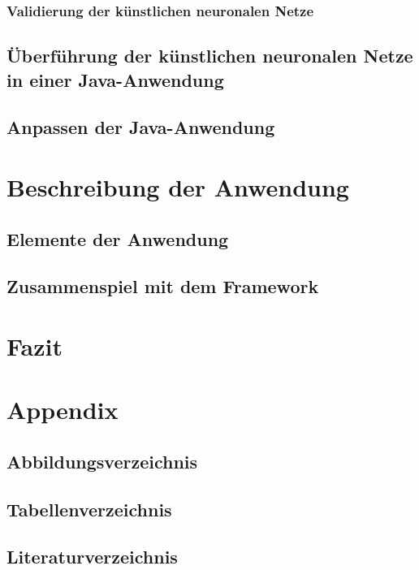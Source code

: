 \documentclass[11pt,a4paper]{scrreprt}
\begin{document}
  \subsection{Validierung der künstlichen neuronalen Netze}
	\section{Überführung der künstlichen neuronalen Netze in einer Java-Anwendung}
	\section{Anpassen der Java-Anwendung}

\chapter{Beschreibung der Anwendung}
 \section{Elemente der Anwendung}
 \section{Zusammenspiel mit dem Framework}

\chapter{Fazit}

\chapter{Appendix}
\section{Abbildungsverzeichnis}
\section{Tabellenverzeichnis}
\section{Literaturverzeichnis}
\end{document}
